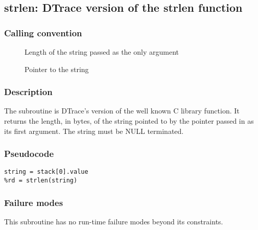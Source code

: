 \clearpage
{}
{}
\label{subr:strlen}
\subsection*{strlen: DTrace version of the strlen function}

\subsubsection*{Calling convention}

\begin{description}
\item[] Length of the string passed as the only argument
\item[] Pointer to the string
\end{description}

\subsubsection*{Description}

The  subroutine is DTrace's version of the well
known C library function.  It returns the length, in bytes, of the string
pointed to by the pointer passed in as its first argument. The string must be
NULL terminated.

\subsubsection*{Pseudocode}

\begin{verbatim}
string = stack[0].value
%rd = strlen(string)
\end{verbatim}

\subsubsection*{Failure modes}

This subroutine has no run-time failure modes beyond its constraints.
